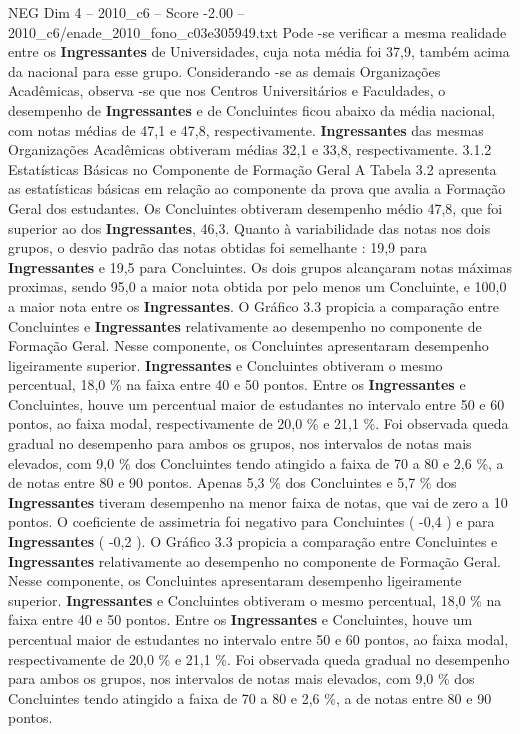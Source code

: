 \begin{textsample}{NEG Dim 4 – 2010\_c6 – Score -2.00 – 2010\_c6/enade\_2010\_fono\_c03e305949.txt}
Pode -se verificar a mesma realidade entre os \textbf{Ingressantes} de Universidades, cuja nota média foi 37,9, também acima da nacional para esse grupo.
Considerando -se as demais Organizações Acadêmicas, observa -se que nos Centros Universitários e Faculdades, o desempenho de \textbf{Ingressantes} e de Concluintes ficou abaixo da média nacional, com notas médias de 47,1 e 47,8, respectivamente. \textbf{Ingressantes} das mesmas Organizações Acadêmicas obtiveram médias 32,1 e 33,8, respectivamente. 3.1.2 Estatísticas Básicas no Componente de Formação Geral A Tabela 3.2 apresenta as estatísticas básicas em relação ao componente da prova que avalia a Formação Geral dos estudantes.
Os Concluintes obtiveram desempenho médio 47,8, que foi superior ao dos \textbf{Ingressantes}, 46,3.
Quanto à variabilidade das notas nos dois grupos, o desvio padrão das notas obtidas foi semelhante : 19,9 para \textbf{Ingressantes} e 19,5 para Concluintes.
Os dois grupos alcançaram notas máximas proximas, sendo 95,0 a maior nota obtida por pelo menos um Concluinte, e 100,0 a maior nota entre os \textbf{Ingressantes}.
O Gráfico 3.3 propicia a comparação entre Concluintes e \textbf{Ingressantes} relativamente ao desempenho no componente de Formação Geral.
Nesse componente, os Concluintes apresentaram desempenho ligeiramente superior. \textbf{Ingressantes} e Concluintes obtiveram o mesmo percentual, 18,0 \% na faixa entre 40 e 50 pontos.
Entre os \textbf{Ingressantes} e Concluintes, houve um percentual maior de estudantes no intervalo entre 50 e 60 pontos, ao faixa modal, respectivamente de 20,0 \% e 21,1 \%.
Foi observada queda gradual no desempenho para ambos os grupos, nos intervalos de notas mais elevados, com 9,0 \% dos Concluintes tendo atingido a faixa de 70 a 80 e 2,6 \%, a de notas entre 80 e 90 pontos.
Apenas 5,3 \% dos Concluintes e 5,7 \% dos \textbf{Ingressantes} tiveram desempenho na menor faixa de notas, que vai de zero a 10 pontos.
O coeficiente de assimetria foi negativo para Concluintes ( -0,4 ) e para \textbf{Ingressantes} ( -0,2 ).
O Gráfico 3.3 propicia a comparação entre Concluintes e \textbf{Ingressantes} relativamente ao desempenho no componente de Formação Geral.
Nesse componente, os Concluintes apresentaram desempenho ligeiramente superior. \textbf{Ingressantes} e Concluintes obtiveram o mesmo percentual, 18,0 \% na faixa entre 40 e 50 pontos.
Entre os \textbf{Ingressantes} e Concluintes, houve um percentual maior de estudantes no intervalo entre 50 e 60 pontos, ao faixa modal, respectivamente de 20,0 \% e 21,1 \%.
Foi observada queda gradual no desempenho para ambos os grupos, nos intervalos de notas mais elevados, com 9,0 \% dos Concluintes tendo atingido a faixa de 70 a 80 e 2,6 \%, a de notas entre 80 e 90 pontos.

\end{textsample}
